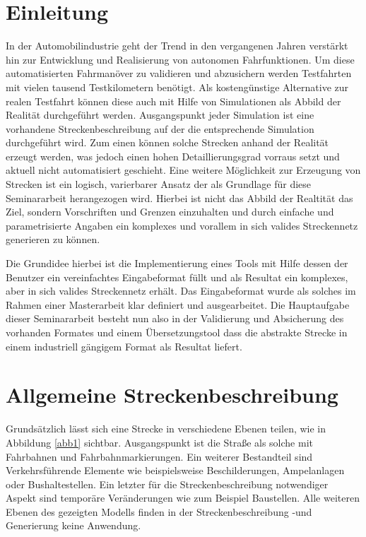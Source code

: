 \thispagestyle{ika}

\chapter{Einleitung}

In der Automobilindustrie geht der Trend in den vergangenen Jahren verstärkt hin zur Entwicklung und Realisierung von autonomen Fahrfunktionen. Um diese automatisierten Fahrmanöver zu validieren und abzusichern werden Testfahrten mit vielen tausend Testkilometern benötigt. Als kostengünstige Alternative zur realen Testfahrt können diese auch mit Hilfe von Simulationen als Abbild der Realität durchgeführt werden. Ausgangspunkt jeder Simulation ist eine vorhandene Streckenbeschreibung auf der die entsprechende Simulation durchgeführt wird. Zum einen können solche Strecken anhand der Realität erzeugt werden, was jedoch einen hohen Detaillierungsgrad vorraus setzt und aktuell nicht automatisiert geschieht. Eine weitere Möglichkeit zur Erzeugung von Strecken ist ein logisch, varierbarer Ansatz der als Grundlage für diese Seminararbeit herangezogen wird. Hierbei ist nicht das Abbild der Realtität das Ziel, sondern Vorschriften und Grenzen einzuhalten und durch einfache und parametrisierte Angaben ein komplexes und vorallem in sich valides Streckennetz generieren zu können.

Die Grundidee hierbei ist die Implementierung eines Tools mit Hilfe dessen der Benutzer ein vereinfachtes Eingabeformat füllt und als Resultat ein komplexes, aber in sich valides Streckennetz erhält. Das Eingabeformat wurde als solches im Rahmen einer Masterarbeit klar definiert und ausgearbeitet. Die Hauptaufgabe dieser Seminararbeit besteht nun also in der Validierung und Absicherung des vorhanden Formates und einem Übersetzungstool dass die abstrakte Strecke in einem industriell gängigem Format als Resultat liefert.

\chapter{Allgemeine Streckenbeschreibung}

Grundsätzlich lässt sich eine Strecke in verschiedene Ebenen teilen, wie in Abbildung \ref{abb1} sichtbar. Ausgangspunkt ist die Straße als solche mit Fahrbahnen und Fahrbahnmarkierungen. Ein weiterer Bestandteil sind Verkehrsführende Elemente wie beispielsweise Beschilderungen, Ampelanlagen oder Bushaltestellen. Ein letzter für die Streckenbeschreibung notwendiger Aspekt sind temporäre Veränderungen wie zum Beispiel Baustellen. Alle weiteren Ebenen des gezeigten Modells finden in der Streckenbeschreibung -und Generierung keine Anwendung.

